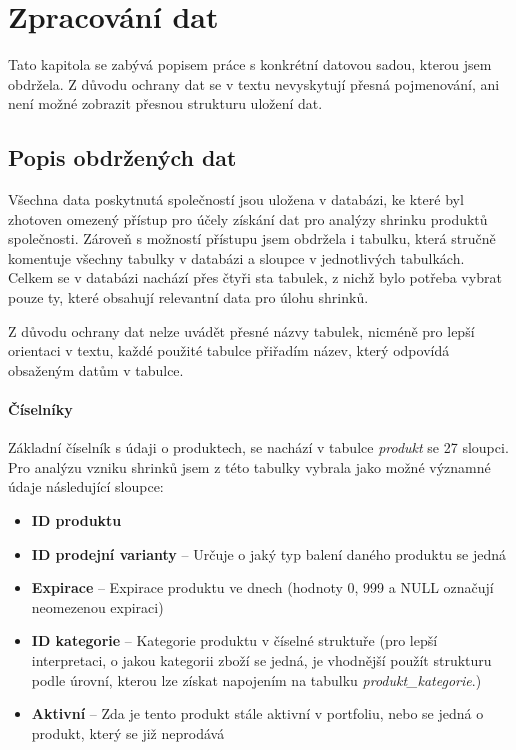\chapter{Zpracování dat}

Tato kapitola se zabývá popisem práce s konkrétní datovou sadou, kterou jsem obdržela. Z důvodu ochrany dat se v textu nevyskytují přesná pojmenování, ani není možné zobrazit přesnou strukturu uložení dat. 

\section{Popis obdržených dat}

Všechna data poskytnutá společností jsou uložena v databázi, ke které byl zhotoven omezený přístup pro účely získání dat pro analýzy shrinku produktů společnosti. Zároveň s možností přístupu jsem obdržela i tabulku, která stručně komentuje všechny tabulky v databázi a sloupce v jednotlivých tabulkách. Celkem se v databázi nachází přes čtyři sta tabulek, z nichž bylo potřeba vybrat pouze ty, které obsahují relevantní data pro úlohu shrinků.

Z důvodu ochrany dat nelze uvádět přesné názvy tabulek, nicméně pro lepší orientaci v textu, každé použité tabulce přiřadím název, který odpovídá obsaženým datům v tabulce.

\subsubsection{Číselníky}

Základní číselník s údaji o produktech, se nachází v tabulce \emph{produkt} se 27 sloupci. Pro analýzu vzniku shrinků jsem z této tabulky vybrala jako možné významné údaje následující sloupce:

\begin{itemize}
    \itemsep0em 
    \item \textbf{ID produktu}
    \item \textbf{ID prodejní varianty} -- Určuje o jaký typ balení daného produktu se jedná    
    \item \textbf{Expirace} -- Expirace produktu ve dnech (hodnoty 0, 999 a NULL označují neomezenou expiraci)
    \item \textbf{ID kategorie} -- Kategorie produktu v číselné struktuře (pro lepší interpretaci, o jakou kategorii zboží se jedná, je vhodnější použít strukturu podle úrovní, kterou lze získat napojením na tabulku \emph{produkt\_kategorie}.)
    \item \textbf{Aktivní} --  Zda je tento produkt stále aktivní v portfoliu, nebo se jedná o produkt, který se již neprodává
\end{itemize}

